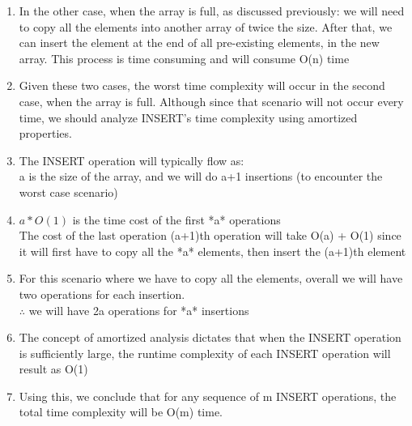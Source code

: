 \documentclass[11pt]{article}
\begin{document}
\begin{enumerate}
\begin{enumerate}
\begin{enumerate}
\begin{enumerate}
                    \item In the other case, when the array is full, as discussed previously: we will need to copy all the elements into another array of twice the size. After that, we can insert the element at the end of all pre-existing elements, in the new array. This process is time consuming and will consume O(n) time
                    \item Given these two cases, the worst time complexity will occur in the second case, when the array is full. Although since that scenario will not occur every time, we should analyze INSERT's time complexity using amortized properties.
                    \item The INSERT operation will typically flow as: \\
                    a is the size of the array, and we will do a+1 insertions (to encounter the worst case scenario)
                    \item $a * O(1)$ is the time cost of the first *a* operations\\
                    The cost of the last operation (a+1)th operation will take O(a) + O(1) since it will first have to copy all the *a* elements, then insert the (a+1)th element
                    \item For this scenario where we have to copy all the elements, overall we will have two operations for each insertion. \\
                    $\therefore$ we will have 2a operations for *a* insertions
                    \item The concept of amortized analysis dictates that when the INSERT operation is sufficiently large, the runtime complexity of each INSERT operation will result as O(1)
                    \item Using this, we conclude that for any sequence of m INSERT operations, the total time complexity will be O(m) time. 
                    

\end{enumerate}
\end{enumerate}
\end{enumerate}
\end{enumerate}
\end{document}
